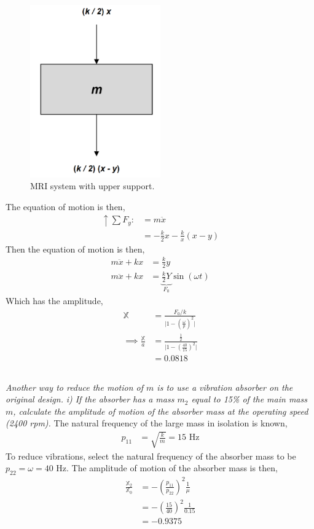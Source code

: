 \begin{figure}[H]
    \centering
    \includegraphics[width=0.5\textwidth]{Questions/Figures/Q2 c).png}
    \caption{MRI system with upper support.}
    \label{fig:Q2 c}
\end{figure}

The equation of motion is then,
\begin{align*}
    \uparrow \sum F_y :&= m \ddot{x} \\
    &= -\frac{k}{2} x - \frac{k}{x} (x - y)
\end{align*}
Then the equation of motion is then,
\begin{align*}
    m \ddot{x} + kx &= \frac{k}{2} y \\
    m \ddot{x} + kx &= \underbrace{\frac{k}{2} Y}_{F_0} \sin(\omega t)
\end{align*}
Which has the amplitude, 
\begin{align}
    \mathbb{X} &= \frac{F_0/k}{\bigg|1 - \left(\frac{\omega}{p}\right)^2\bigg|} \\
    \implies \frac{\mathbb{X}}{a} &= \frac{\frac{1}{2}}{\bigg|1 - \left(\frac{40}{15}\right)^2\bigg|} \\
    &= \boxed{0.0818}
\end{align}

\subsection{}
\textit{Another way to reduce the motion of $m$ is to use a vibration absorber on the original design.}
\textit{i) If the absorber has a mass $m_2$ equal to 15\% of the main mass $m$, calculate the amplitude of motion of the absorber mass at the operating speed (2400 rpm).}
The natural frequency of the large mass in isolation is known,
\begin{align*}
    p_{11} &= \sqrt{\frac{k}{m}} = 15 \text{ Hz}
\end{align*}
To reduce vibrations, select the natural frequency of the absorber mass to be $p_{22} = \omega = 40$ Hz. The amplitude of motion of the absorber mass is then,
\begin{align*}
    \frac{\mathbb{X}_2}{\mathbb{X}_0} &= -\left(\frac{p_{11}}{p_{22}}\right)^2 \frac{1}{\mu} \\
    &= -\left(\frac{15}{40}\right)^2 \frac{1}{0.15} \\
    &= \boxed{-0.9375}
\end{align*}

